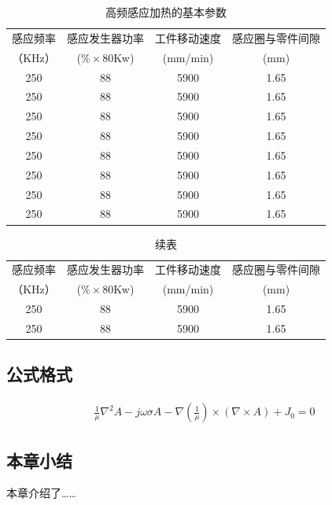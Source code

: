 \documentclass[UTF8,a4paper,12pt]{ctexart}
\numberwithin{equation}{section}
\begin{document}
\begin{table}[!htbp]
\centering
\caption{高频感应加热的基本参数}
\begin{tabular}{|c| c|c|c|}
\hline
感应频率 &感应发生器功率 & 工件移动速度  &感应圈与零件间隙\\
（KHz）&($\% \times$80Kw) &(mm/min)  &(mm)\\
\hline
250 &88 &5900 &1.65\\
\hline
250 &88 &5900 &1.65\\
\hline
250 &88 &5900 &1.65\\
\hline
250 &88 &5900 &1.65\\
\hline
250 &88 &5900 &1.65\\
\hline
250 &88 &5900 &1.65\\
\hline
250 &88 &5900 &1.65\\
\hline
250 &88 &5900 &1.65\\
\hline
\end{tabular}
\end{table}

\begin{table}
\centering
\captionsetup{singlelinecheck=off}
\caption*{续表} %
\begin{tabular}{|c| c|c|c|}
\hline
感应频率 &感应发生器功率 & 工件移动速度  &感应圈与零件间隙\\
（KHz）&($\% \times$80Kw) &(mm/min)  &(mm)\\
\hline
250 &88 &5900 &1.65\\
\hline
250 &88 &5900 &1.65\\
\hline
\end{tabular}
\end{table}


\subsection{公式格式}

\vspace{-10mm}
\begin{eqnarray}
\frac{1}{\mu} \nabla^2A - j \omega \sigma A -\nabla(\frac{1}{\mu}) \times(\nabla \times A)+J_0=0
\end{eqnarray}

\subsection{本章小结}
本章介绍了……

\newpage
{}
\end{document}
